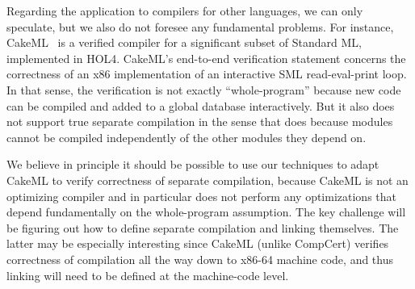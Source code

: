Regarding the application to compilers for other languages, we can
only speculate, but we also do not foresee any fundamental problems.
For instance, CakeML~\cite{cakeml} is a verified compiler for a
significant subset of Standard ML, implemented in HOL4.  CakeML's
end-to-end verification statement concerns the correctness of an x86
implementation of an interactive SML read-eval-print loop.  In that
sense, the verification is not exactly ``whole-program'' because new
code can be compiled and added to a global database interactively.
But it also does not support true separate compilation in the sense
that \sepcomp{} does because modules cannot be compiled independently
of the other modules they depend on.

We believe in principle it should be possible to use our techniques to
adapt CakeML to verify correctness of separate compilation, because
CakeML is not an optimizing compiler and in particular does not
perform any optimizations that depend fundamentally on the
whole-program assumption.  The key challenge will be figuring out how
to define separate compilation and linking themselves.  The latter may
be especially interesting since CakeML (unlike CompCert) verifies
correctness of compilation all the way down to x86-64 machine code,
and thus linking will need to be defined at the machine-code level.



